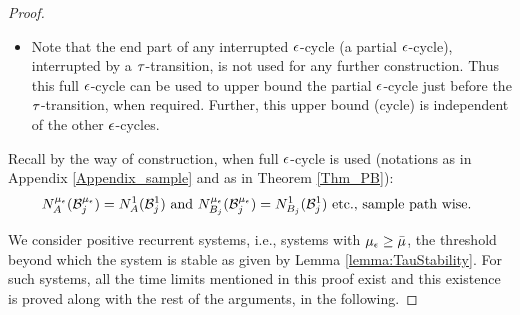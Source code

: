 \begin{proof}
\begin{itemize}
	\item Note that   the end part of any interrupted ${ \epsilon }$-cycle  (a partial ${ \epsilon }$-cycle), interrupted by a  ${\tau}$-transition,  is not used for any further construction.   
	Thus this full ${ \epsilon }$-cycle can be used to upper bound the partial   ${ \epsilon }$-cycle just before the ${\tau}$-transition,    when required. Further, this upper bound  (cycle) is independent of the other ${ \epsilon }$-cycles. 
	
	
\end{itemize}  
Recall 
by the way of construction, when full ${ \epsilon }$-cycle is used (notations as in Appendix \ref{Appendix_sample} and as in Theorem \ref{Thm_PB}):
\begin{eqnarray*} 
N_A^{\mu_\epsilon} ({\mathcal B}_j^{\mu_\epsilon}  ) = N_A^1 ( {\mathcal B}_j^1 )   \   \mbox{and}   \    N_{B_j}^{\mu_\epsilon} ({\mathcal B}_j^{\mu_\epsilon}  ) = N_{B_j}^1 ( {\mathcal B}_j^1 )  \mbox{ etc., sample path wise. }
\end{eqnarray*}
%

We consider positive recurrent systems, i.e., systems with  $\mu_{ \epsilon } \ge {\bar \mu}$, the threshold beyond which the system is stable as given by Lemma \ref{lemma:TauStability}. 
For such systems,
all the time limits mentioned in this proof exist   and  this existence is proved  along with the rest of the arguments, in the following. 


\end{proof}
